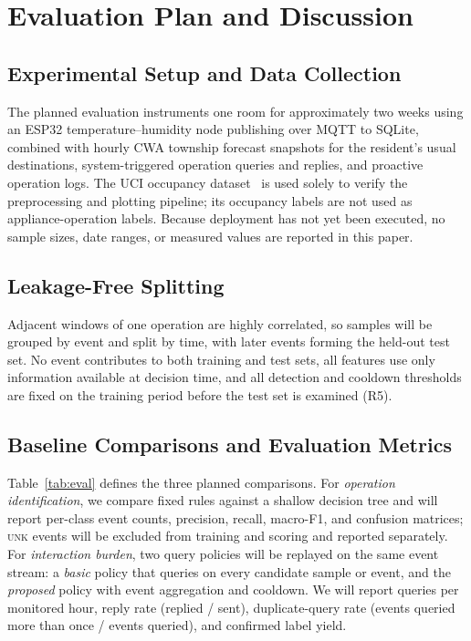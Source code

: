 \section{Evaluation Plan and Discussion}\label{sec:experiments}
\subsection{Experimental Setup and Data Collection}
The planned evaluation instruments one room for approximately two weeks using an ESP32 temperature--humidity node publishing over MQTT to SQLite, combined with hourly CWA township forecast snapshots for the resident's usual destinations, system-triggered operation queries and replies, and proactive operation logs. The UCI occupancy dataset~\cite{candanedo2016occupancy} is used solely to verify the preprocessing and plotting pipeline; its occupancy labels are not used as appliance-operation labels. Because deployment has not yet been executed, no sample sizes, date ranges, or measured values are reported in this paper.

\subsection{Leakage-Free Splitting}
Adjacent windows of one operation are highly correlated, so samples will be grouped by event and split by time, with later events forming the held-out test set. No event contributes to both training and test sets, all features use only information available at decision time, and all detection and cooldown thresholds are fixed on the training period before the test set is examined (R5).

\subsection{Baseline Comparisons and Evaluation Metrics}
Table~\ref{tab:eval} defines the three planned comparisons. For \emph{operation identification}, we compare fixed rules against a shallow decision tree and will report per-class event counts, precision, recall, macro-F1, and confusion matrices; \textsc{unk} events will be excluded from training and scoring and reported separately. For \emph{interaction burden}, two query policies will be replayed on the same event stream: a \emph{basic} policy that queries on every candidate sample or event, and the \emph{proposed} policy with event aggregation and cooldown. We will report queries per monitored hour, reply rate (replied / sent), duplicate-query rate (events queried more than once / events queried), and confirmed label yield.

